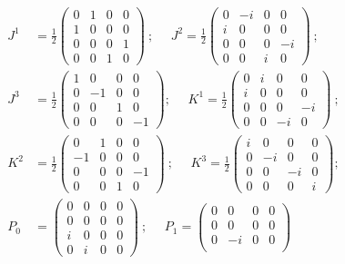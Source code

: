 \documentclass[aps,reprint,notitlepage,nofootinbib,superscriptaddress]{revtex4-1}
\begin{document}
\begin{align}\label{explicite44}
    J^{1}&=\frac{1}{2}\begin{pmatrix}
    0&1&0&0\\
    1&0&0&0\\
    0&0&0&1\\
    0&0&1&0
    \end{pmatrix}~;~~~~~~J^{2}=\frac{1}{2}\begin{pmatrix}
    0&-i&0&0\\
    i&0&0&0\\
    0&0&0&-i\\
    0&0&i&0
    \end{pmatrix}~;\nonumber\\
    J^{3}&=\frac{1}{2}\begin{pmatrix}
    1&0&0&0\\
    0&-1&0&0\\
    0&0&1&0\\
    0&0&0&-1
    \end{pmatrix};~~~~~~K^{1}=\frac{1}{2}\begin{pmatrix}
    0&i&0&0\\
    i&0&0&0\\
    0&0&0&-i\\
    0&0&-i&0
    \end{pmatrix}~;\nonumber\\
    K^{2}&=\frac{1}{2}\begin{pmatrix}
    0&1&0&0\\
    -1&0&0&0\\
    0&0&0&-1\\
    0&0&1&0
    \end{pmatrix}~;~~~~~~K^{3}=\frac{1}{2}\begin{pmatrix}
    i&0&0&0\\
    0&-i&0&0\\
    0&0&-i&0\\
    0&0&0&i
    \end{pmatrix};\nonumber\\
    P_0&=\begin{pmatrix}
    0&0&0&0\\
    0&0&0&0\\
    i&0&0&0\\
    0&i&0&0
    \end{pmatrix}~;~~~~~~P_1=\begin{pmatrix}
    0&0&0&0\\
    0&0&0&0\\
    0&-i&0&0\\

\end{pmatrix}
\end{align}
\end{document}
